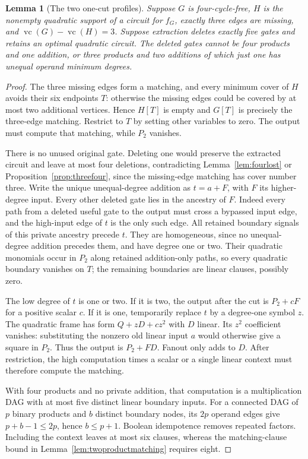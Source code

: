 \documentclass[11pt]{article}
\newcommand{\vc}{\operatorname{vc}}
\newtheorem{lemma}[theorem]{Lemma}
\theoremstyle{definition}
\theoremstyle{remark}
\begin{document}
\begin{lemma}[The two one-cut profiles]\label{lem:onecutprofiles}
Suppose $G$ is four-cycle-free, $H$ is the nonempty quadratic support of a circuit for $f_G$, exactly three edges are missing, and $\vc(G)-\vc(H)=3$. Suppose extraction deletes exactly five gates and retains an optimal quadratic circuit. The deleted gates cannot be four products and one addition, or three products and two additions of which just one has unequal operand minimum degrees.
\end{lemma}
\begin{proof}
The three missing edges form a matching, and every minimum cover of $H$ avoids their six endpoints $T$: otherwise the missing edges could be covered by at most two additional vertices. Hence $H[T]$ is empty and $G[T]$ is precisely the three-edge matching. Restrict to $T$ by setting other variables to zero. The output must compute that matching, while $P_2$ vanishes.

There is no unused original gate. Deleting one would preserve the extracted circuit and leave at most four deletions, contradicting Lemma~\ref{lem:fourlost} or Proposition~\ref{prop:threefour}, since the missing-edge matching has cover number three. Write the unique unequal-degree addition as $t=a+F$, with $F$ its higher-degree input. Every other deleted gate lies in the ancestry of $F$. Indeed every path from a deleted useful gate to the output must cross a bypassed input edge, and the high-input edge of $t$ is the only such edge. All retained boundary signals of this private ancestry precede $t$. They are homogeneous, since no unequal-degree addition precedes them, and have degree one or two. Their quadratic monomials occur in $P_2$ along retained addition-only paths, so every quadratic boundary vanishes on $T$; the remaining boundaries are linear clauses, possibly zero.

The low degree of $t$ is one or two. If it is two, the output after the cut is $P_2+cF$ for a positive scalar $c$. If it is one, temporarily replace $t$ by a degree-one symbol $z$. The quadratic frame has form $Q+zD+cz^2$ with $D$ linear. Its $z^2$ coefficient vanishes: substituting the nonzero old linear input $a$ would otherwise give a square in $P_2$. Thus the output is $P_2+FD$. Fanout only adds to $D$. After restriction, the high computation times a scalar or a single linear context must therefore compute the matching.

With four products and no private addition, that computation is a multiplication DAG with at most five distinct linear boundary inputs. For a connected DAG of $p$ binary products and $b$ distinct boundary nodes, its $2p$ operand edges give $p+b-1\le2p$, hence $b\le p+1$. Boolean idempotence removes repeated factors. Including the context leaves at most six clauses, whereas the matching-clause bound in Lemma~\ref{lem:twoproductmatching} requires eight.


\end{proof}
\end{document}
